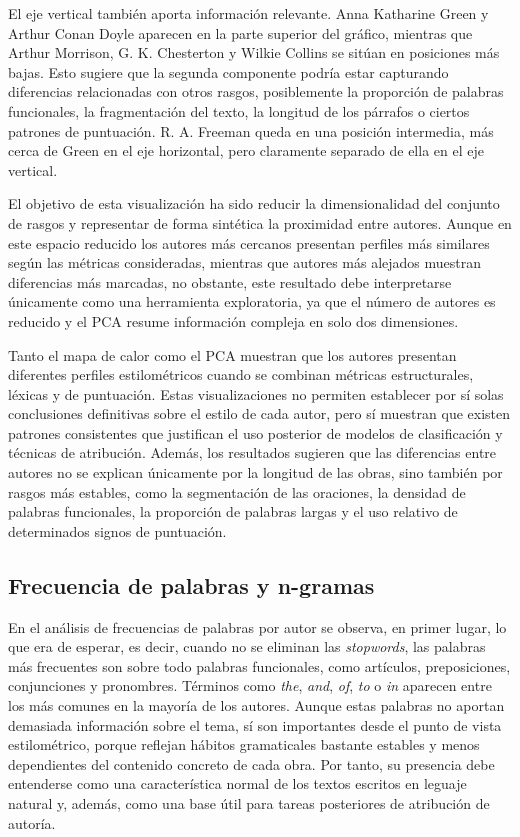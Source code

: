\documentclass[IB]{TFUOC}%
\begin{document}
El eje vertical también aporta información relevante. Anna Katharine Green y Arthur Conan Doyle aparecen en la parte superior del gráfico, mientras que Arthur Morrison, G. K. Chesterton y Wilkie Collins se sitúan en posiciones más bajas. Esto sugiere que la segunda componente podría estar capturando diferencias relacionadas con otros rasgos, posiblemente la proporción de palabras funcionales, la fragmentación del texto, la longitud de los párrafos o ciertos patrones de puntuación. R. A. Freeman queda en una posición intermedia, más cerca de Green en el eje horizontal, pero claramente separado de ella en el eje vertical.

El objetivo de esta visualización ha sido reducir la dimensionalidad del conjunto de rasgos y representar de forma sintética la proximidad entre autores. Aunque en este espacio reducido los autores más cercanos presentan perfiles más similares según las métricas consideradas, mientras que autores más alejados muestran diferencias más marcadas, no obstante, este resultado debe interpretarse únicamente como una herramienta exploratoria, ya que el número de autores es reducido y el PCA resume información compleja en solo dos dimensiones.

Tanto el mapa de calor como el PCA muestran que los autores presentan diferentes perfiles estilométricos cuando se combinan métricas estructurales, léxicas y de puntuación. Estas visualizaciones no permiten establecer por sí solas conclusiones definitivas sobre el estilo de cada autor, pero sí muestran que existen patrones consistentes que justifican el uso posterior de modelos de clasificación y técnicas de atribución. Además, los resultados sugieren que las diferencias entre autores no se explican únicamente por la longitud de las obras, sino también por rasgos más estables, como la segmentación de las oraciones, la densidad de palabras funcionales, la proporción de palabras largas y el uso relativo de determinados signos de puntuación.

\subsection{Frecuencia de palabras y n-gramas}

En el análisis de frecuencias de palabras por autor se observa, en primer lugar, lo que era de esperar, es decir, cuando no se eliminan las \textit{stopwords}, las palabras más frecuentes son sobre todo palabras funcionales, como artículos, preposiciones, conjunciones y pronombres. Términos como \textit{the}, \textit{and}, \textit{of}, \textit{to} o \textit{in} aparecen entre los más comunes en la mayoría de los autores. Aunque estas palabras no aportan demasiada información sobre el tema, sí son importantes desde el punto de vista estilométrico, porque reflejan hábitos gramaticales bastante estables y menos dependientes del contenido concreto de cada obra. Por tanto, su presencia debe entenderse como una característica normal de los textos escritos en leguaje natural y, además, como una base útil para tareas posteriores de atribución de autoría.
\end{document}
